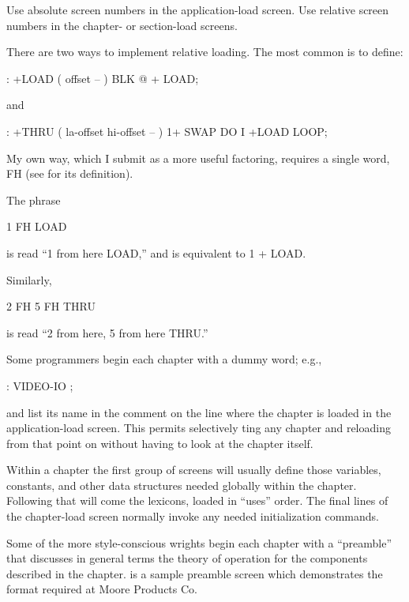 \begin{tip}
Use absolute screen numbers in the application-load screen.  Use relative
screen numbers in the chapter- or section-load screens.
\end{tip}
There are two ways to implement relative loading.  The most common is
to define:
\begin{Code}
: +LOAD  ( offset -- )  BLK @ +  LOAD;
\end{Code}
and
\begin{Code}
: +THRU  ( la-offset hi-offset -- )
     1+ SWAP DO  I +LOAD  LOOP;
\end{Code}
My own way, which I submit as a more useful factoring, requires a single
word, FH (see  for its definition).

The phrase
\begin{Code}
1 FH LOAD
\end{Code}
is read ``1 from here LOAD,'' and is equivalent to 1 + LOAD.

Similarly,
\begin{Code}
2 FH   5 FH THRU
\end{Code}
is read ``2 from here, 5 from here THRU.''

Some programmers begin each chapter with a dummy word; e.g.,
\begin{Code}
: VIDEO-IO ;
\end{Code}
and list its name in the comment on the line where the chapter is loaded in
the application-load screen.  This permits selectively ting any
chapter and reloading from that point on without having to look at the
chapter itself.

Within a chapter the first group of screens will usually define those
variables, constants, and other data structures needed globally within
the chapter.  Following that will come the lexicons, loaded in ``uses''
order.  The final lines of the chapter-load screen normally invoke any
needed initialization commands.

Some of the more style-conscious \Forth{}wrights begin each
chapter with a ``preamble'' that discusses in general terms the theory of
operation for the components described in the chapter.   is a
sample preamble screen which demonstrates the format required at
Moore Products Co.

